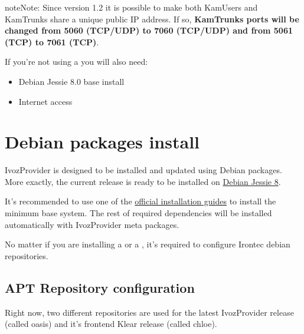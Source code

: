 \documentclass[letterpaper,10pt,english]{sphinxmanual}
\begin{document}
\begin{notice}{note}{Note:}
Since version 1.2 it is possible to make both KamUsers and KamTrunks
share a unique public IP address. If so, \textbf{KamTrunks ports will be changed
from 5060 (TCP/UDP) to 7060 (TCP/UDP) and from 5061 (TCP) to 7061 (TCP)}.
\end{notice}

If you're not using a {\hyperref[installation/cd_install:automatic\string-iso\string-cd\string-image]{}} you will also need:
\begin{itemize}
\item {} 
Debian Jessie 8.0 base install

\item {} 
Internet access

\end{itemize}


\section{Debian packages install}
\label{installation/debian_install::doc}\label{installation/debian_install:debian-packages-install}
IvozProvider is designed to be installed and updated using Debian packages.
More exactly, the current release is ready to be installed on
\href{https://www.debian.org/releases/jessie}{Debian Jessie 8}.

It's recommended to use one of the \href{https://www.debian.org/releases/jessie/installmanual}{official installation guides} to install the minimum
base system. The rest of required  dependencies will be installed automatically
with IvozProvider meta packages.

No matter if you are installing a  {\hyperref[installation/install_types:standalone\string-install]{}} or a
{\hyperref[installation/install_types:distributed\string-install]{}}, it's required to configure Irontec debian
repositories.


\subsection{APT Repository configuration}
\label{installation/debian_install:apt-repository-configuration}
Right now, two different repositories are used for the latest IvozProvider
release (called oasis) and it's frontend Klear release (called chloe).
\end{document}

